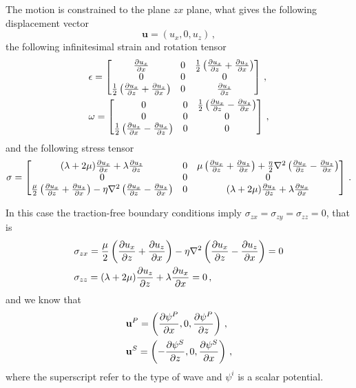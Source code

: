 \documentclass[12pt]{article}
\begin{document}
The motion is constrained to the plane \(zx\) plane, what gives the following displacement vector
\[\mathbf{u} = (u_x, 0, u_z)\, ,\]
the following infinitesimal strain and rotation tensor
\begin{align*}
  &\epsilon = \begin{bmatrix}
    \pdv{u_x}{x} &0 &\frac{1}{2}\left(\pdv{u_x}{z} + \pdv{u_z}{x}\right)\\
    0 &0 &0\\
    \frac{1}{2}\left(\pdv{u_x}{z} + \pdv{u_z}{x}\right) &0 &\pdv{u_z}{z}
    \end{bmatrix}\, ,\\
  &\omega = \begin{bmatrix}
    0 &0 &\frac{1}{2}\left(\pdv{u_x}{z} - \pdv{u_z}{x}\right)\\
    0 &0 &0\\
    \frac{1}{2}\left(\pdv{u_z}{x} - \pdv{u_x}{z}\right) &0 &0
    \end{bmatrix}\, ,
\end{align*}
and the following stress tensor
\[\sigma = \begin{bmatrix}
  (\lambda + 2\mu)\pdv{u_x}{x} + \lambda \pdv{u_z}{z} &0 &\mu\left(\pdv{u_x}{z} + \pdv{u_z}{x}\right) + \frac{\eta}{2}\laplacian \left(\pdv{u_x}{z} - \pdv{u_z}{x}\right)\\
  0 &0 &0\\
  \frac{\mu}{2}\left(\pdv{u_x}{z} + \pdv{u_z}{x}\right) - \eta\laplacian\left(\pdv{u_x}{z} - \pdv{u_z}{x}\right) &0 &(\lambda + 2\mu)\pdv{u_z}{z} + \lambda\pdv{u_x}{x}
\end{bmatrix}\, .\]

In this case the traction-free boundary conditions imply \(\sigma_{zx} = \sigma_{zy}=\sigma_{zz} = 0\), that is
\begin{align*}
  &\sigma_{zx} = \frac{\mu}{2}\left(\pdv{u_x}{z} + \pdv{u_z}{x}\right) - \eta\laplacian\left(\pdv{u_x}{z} - \pdv{u_z}{x}\right) = 0\\
  &\sigma_{zz} = (\lambda + 2\mu)\pdv{u_z}{z} + \lambda \pdv{u_x}{x} = 0\, ,
\end{align*}
and we know that
\begin{align*}
  &\mathbf{u}^P = \left(\pdv{\psi^P}{x}, 0, \pdv{\psi^P}{z}\right)\, ,\\
  &\mathbf{u}^S = \left(-\pdv{\psi^S}{z}, 0, \pdv{\psi^S}{x}\right)\, ,
\end{align*}
where the superscript refer to the type of wave and \(\psi^i\) is a scalar potential.
\end{document}

